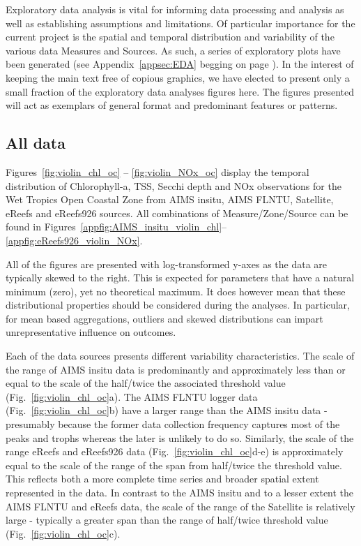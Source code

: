 \documentclass[a4paper]{AIMSreport}
\begin{document}
Exploratory data analysis is vital for informing data processing and analysis as well as
establishing assumptions and limitations.  Of particular importance for the current project is the
spatial and temporal distribution and variability of the various data Measures and Sources.  As
such, a series of exploratory plots have been generated (see Appendix~\ref{appsec:EDA} begging on
page \pageref{appsec:EDA}).  In the interest of keeping the main text free of copious graphics, we
have elected to present only a small fraction of the exploratory data analyses figures here.  The
figures presented will act as exemplars of general format and predominant features or patterns.

\subsection{All data}

Figures~\ref{fig:violin_chl_oc} -- \ref{fig:violin_NOx_oc} display the temporal distribution of
Chlorophyll-a, TSS, Secchi depth and NOx observations for the Wet Tropics Open Coastal Zone from
AIMS insitu, AIMS FLNTU, Satellite, eReefs and eReefs926 sources. All combinations of
Measure/Zone/Source can be found in
Figures~\ref{appfig:AIMS_insitu_violin_chl}--\ref{appfig:eReefs926_violin_NOx}.

All of the figures are presented with log-transformed y-axes as the data are typically skewed to the
right.  This is expected for parameters that have a natural minimum (zero), yet no theoretical
maximum.  It does however mean that these distributional properties should be considered during the
analyses.  In particular, for mean based aggregations, outliers and skewed distributions can impart
unrepresentative influence on outcomes.

Each of the data sources presents different variability characteristics.  The scale of the range of
AIMS insitu data is predominantly and approximately less than or equal to the scale of the
half/twice the associated threshold value (Fig.~\ref{fig:violin_chl_oc}a).  The AIMS FLNTU logger
data (Fig.~\ref{fig:violin_chl_oc}b) have a larger range than the AIMS insitu data - presumably
because the former data collection frequency captures most of the peaks and trophs whereas the later
is unlikely to do so.  Similarly, the scale of the range eReefs and eReefs926 data
(Fig.~\ref{fig:violin_chl_oc}d-e) is approximately equal to the scale of the range of the span from
half/twice the threshold value.  This reflects both a more complete time series and broader spatial
extent represented in the data.  In contrast to the AIMS insitu and to a lesser extent the AIMS
FLNTU and eReefs data, the scale of the range of the Satellite is relatively large - typically a
greater span than the range of half/twice threshold value (Fig.~\ref{fig:violin_chl_oc}c).
\end{document}
